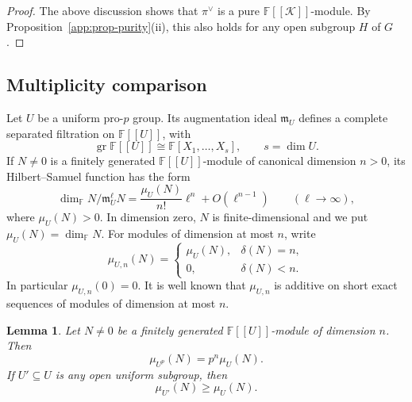 \documentclass[11pt]{article}
\numberwithin{equation}{section}
\newtheorem{lemma}[theorem]{Lemma}
\theoremstyle{definition}
\theoremstyle{remark}
\newcommand{\F}{\mathbb F}
\newcommand{\fm}{\mathfrak m}
\DeclareMathOperator{\gr}{gr}
\begin{document}
\begin{cbunit}
\begin{proof}
The above discussion shows that $\pi^{\vee}$ is a pure $\F[[\mathcal{K}]]$-module. By Proposition~\ref{app:prop-purity}(ii), this also holds for any open subgroup $H$ of $G$.
\end{proof}


\subsection{Multiplicity comparison}
\label{app:subsec-multiplicity}

Let $U$ be a uniform pro-$p$ group. Its augmentation ideal
$\fm_U$ defines a complete separated filtration on $\F[[U]]$, with
\[
 \gr\F[[U]]\cong\F[X_1,\ldots,X_s],\qquad s=\dim U.
\]
If $N\ne0$ is a finitely generated $\F[[U]]$-module of canonical
dimension $n>0$, its Hilbert--Samuel function has the form
\begin{equation}\label{app:eq-hilbert-samuel}
 \dim_{\F}N/\fm_U^\ell N
   =\frac{\mu_U(N)}{n!}\ell^n+O(\ell^{n-1})
   \qquad(\ell\longrightarrow\infty),
\end{equation}
where $\mu_U(N)>0$. In dimension zero, $N$ is finite-dimensional
and we put $\mu_U(N)=\dim_{\F}N$. For modules of dimension at
most $n$, write
\[
 \mu_{U,n}(N)=
 \begin{cases}
 \mu_U(N),&\delta(N)=n,\\
 0,&\delta(N)<n.
 \end{cases}
\]
In particular $\mu_{U,n}(0)=0$. It is well known that
$\mu_{U,n}$ is additive on short exact sequences of modules
of dimension at most $n$.

\begin{lemma}\label{app:lem-multiplicity-scale}
Let $N\ne0$ be a finitely generated $\F[[U]]$-module of
dimension $n$. Then
\begin{equation}\label{app:eq-multiplicity-scale}
 \mu_{U^p}(N)=p^n\mu_U(N).
\end{equation}
If $U'\subseteq U$ is any open uniform subgroup, then
\begin{equation}\label{app:eq-multiplicity-monotonicity}
 \mu_{U'}(N)\geq\mu_U(N).
\end{equation}
\end{lemma}


\end{cbunit}
\end{document}
